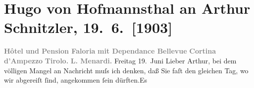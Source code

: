 

         
         \renewcommand{\erwaehntePersonen}{Personen: Johann Wolfgang von Goethe, Friedrich Hebbel, Luigi Menardi}
         \renewcommand{\erwaehnteOrte}{Orte: Bellevue, Berlin, Cortina d'Ampezzo, Hôtel und Pension Faloria, London, Sankt Petersburg, Südtirol, Wien}
         \renewcommand{\erwaehnteWerke}{Werke: Briefwechsel mit Freunden und berühmten Zeitgenossen, Faust. Eine Tragödie}
               \section[Hugo von Hofmannsthal an Arthur Schnitzler, 19. 6. {[}1903{]}]{ Hugo von Hofmannsthal an Arthur Schnitzler, 19. 6. {[}1903{]}}\nopagebreak{}\rehead{ }\begin{ledgroupsized}[t]{13cm}\normalsize\beginnumbering \toendnotes[C]{\smallbreak\pagebreak[2]} 
\toendnotes[C]{\smallbreak}\pstart
           \noindent{}\centering{}{\pb}\textcolor{gray}{\textbf{Hôtel und Pension Faloria}}\pend
           \pstart
           \noindent{}\centering{}\textcolor{gray}{\textbf{mit Dependance Bellevue}}\pend
           \pstart
           \noindent{}\raggedleft{}\textcolor{gray}{\textbf{Cortina d’Ampezzo}}\pend
           \pstart
           \noindent{}\raggedleft{}\textcolor{gray}{\textbf{Tirolo.}}\pend
           \pstart
           \noindent{}\raggedleft{}\textcolor{gray}{\textbf{L. Menardi.}}\pend
           \pstart
           \centering{}Freitag 19. Juni\pend
           \pstart{}Lieber Arthur,\pend\pstart
           bei dem völligen Mangel an Nachricht muſs ich denken, daß Sie faſt den gleichen Tag,
               wo wir abgereiſt ſind, angekommen ſein dürften.\hspace*{1.5em}Es

\end{ledgroupsized}
